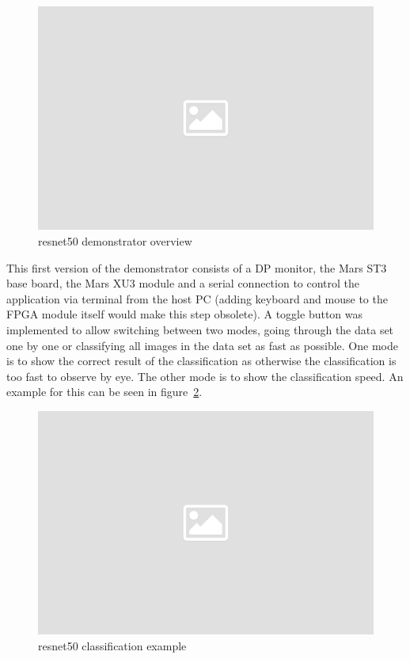 \begin{figure}[!htb]
	\centering
		\includegraphics[width=\textwidth]{bilder/placeholder.png}
		\caption{resnet50 demonstrator overview}
		\label{fig:st3_demo_resnet}
\end{figure}
This first version of the demonstrator consists of a \ac{DP} monitor, the Mars ST3 base board, the Mars XU3 module and a serial connection to control the application via terminal from the host PC (adding keyboard and mouse to the \ac{FPGA} module itself would make this step obsolete).
A toggle button was implemented to allow switching between two modes, going through the data set one by one or classifying all images in the data set as fast as possible. One mode is to show the correct result of the classification as otherwise the classification is too fast to observe by eye. The other mode is to show the classification speed. An example for this can be seen in figure~\ref{fig:resnet_classification}.
\begin{figure}[!htb]
	\centering
		\includegraphics[width=\textwidth]{bilder/placeholder.png}
		\caption{resnet50 classification example}
		\label{fig:resnet_classification}
\end{figure}